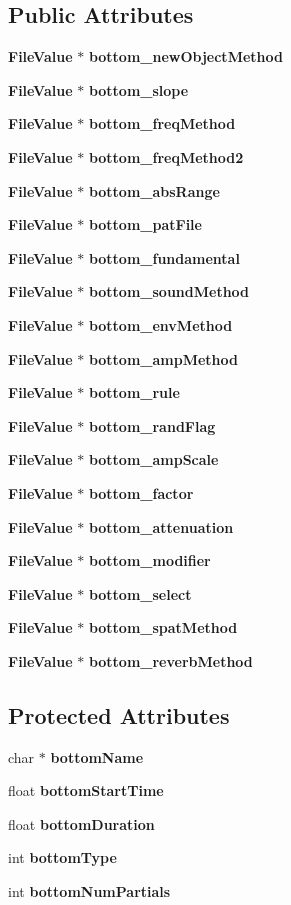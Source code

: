 \subsection*{Public Attributes}
\begin{CompactItemize}
\item 
{\bf File\-Value} $\ast$ {\bf bottom\_\-new\-Object\-Method}
\item 
{\bf File\-Value} $\ast$ {\bf bottom\_\-slope}
\item 
{\bf File\-Value} $\ast$ {\bf bottom\_\-freq\-Method}
\item 
{\bf File\-Value} $\ast$ {\bf bottom\_\-freq\-Method2}
\item 
{\bf File\-Value} $\ast$ {\bf bottom\_\-abs\-Range}
\item 
{\bf File\-Value} $\ast$ {\bf bottom\_\-pat\-File}
\item 
{\bf File\-Value} $\ast$ {\bf bottom\_\-fundamental}
\item 
{\bf File\-Value} $\ast$ {\bf bottom\_\-sound\-Method}
\item 
{\bf File\-Value} $\ast$ {\bf bottom\_\-env\-Method}
\item 
{\bf File\-Value} $\ast$ {\bf bottom\_\-amp\-Method}
\item 
{\bf File\-Value} $\ast$ {\bf bottom\_\-rule}
\item 
{\bf File\-Value} $\ast$ {\bf bottom\_\-rand\-Flag}
\item 
{\bf File\-Value} $\ast$ {\bf bottom\_\-amp\-Scale}
\item 
{\bf File\-Value} $\ast$ {\bf bottom\_\-factor}
\item 
{\bf File\-Value} $\ast$ {\bf bottom\_\-attenuation}
\item 
{\bf File\-Value} $\ast$ {\bf bottom\_\-modifier}
\item 
{\bf File\-Value} $\ast$ {\bf bottom\_\-select}
\item 
{\bf File\-Value} $\ast$ {\bf bottom\_\-spat\-Method}
\item 
{\bf File\-Value} $\ast$ {\bf bottom\_\-reverb\-Method}
\end{CompactItemize}
\subsection*{Protected Attributes}
\begin{CompactItemize}
\item 
char $\ast$ {\bf bottom\-Name}
\item 
float {\bf bottom\-Start\-Time}
\item 
float {\bf bottom\-Duration}
\item 
int {\bf bottom\-Type}
\item 
int {\bf bottom\-Num\-Partials}
\end{CompactItemize}

